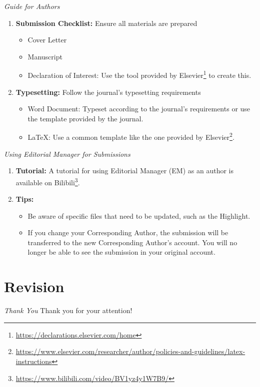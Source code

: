 \documentclass{beamer}
\begin{document}
\begin{frame}{\textit{Guide for Authors}}
    \begin{enumerate}
        \item \textbf{Submission Checklist:} Ensure all materials are prepared
              \begin{itemize}
                  \item Cover Letter
                  \item Manuscript
                  \item Declaration of Interest: Use the tool provided by Elsevier\footnote{\url{https://declarations.elsevier.com/home}} to create this.
              \end{itemize}
        \item \textbf{Typesetting:} Follow the journal's typesetting requirements
              \begin{itemize}
                  \item Word Document: Typeset according to the journal's requirements or use the template provided by the journal.
                  \item \LaTeX: Use a common template like the one provided by Elsevier\footnote{\url{https://www.elsevier.com/researcher/author/policies-and-guidelines/latex-instructions}}.
              \end{itemize}
    \end{enumerate}
\end{frame}

\begin{frame}{\textit{Using Editorial Manager for Submissions}}
    \begin{enumerate}
        \item \textbf{Tutorial:} A tutorial for using Editorial Manager (EM) as an author is available on Bilibili\footnote{\url{https://www.bilibili.com/video/BV1yz4y1W7B9/}}.
        \item \textbf{Tips:}
              \begin{itemize}
                  \item Be aware of specific files that need to be updated, such as the Highlight.
                  \item If you change your Corresponding Author, the submission will be transferred to the new Corresponding Author's account. You will no longer be able to see the submission in your original account.
              \end{itemize}
    \end{enumerate}
\end{frame}

\section{Revision}




\begin{frame}{\textit{Thank You}}
    \centering
    \Large
    Thank you for your attention! \\
\end{frame}
\end{document}

